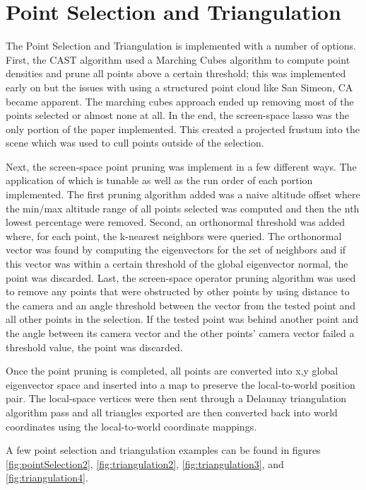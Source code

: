 \section{Point Selection and Triangulation}

The Point Selection and Triangulation is implemented with a number of options. First, the CAST algorithm used a Marching Cubes algorithm to compute point densities and prune all points above a certain threshold; this was implemented early on but the issues with using a structured point cloud like San Simeon, CA became apparent. The marching cubes approach ended up removing most of the points selected or almost none at all. In the end, the screen-space lasso was the only portion of the paper implemented. This created a projected frustum into the scene which was used to cull points outside of the selection. 

Next, the screen-space point pruning was implement in a few different ways. The application of which is tunable as well as the run order of each portion implemented. The first pruning algorithm added was a naive altitude offset where the min/max altitude range of all points selected was computed and then the nth lowest percentage were removed. Second, an orthonormal threshold was added where, for each point, the k-nearest neighbors were queried. The orthonormal vector was found by computing the eigenvectors for the set of neighbors and if this vector was within a certain threshold of the global eigenvector normal, the point was discarded. Last, the screen-space operator pruning algorithm was used to remove any points that were obstructed by other points by using distance to the camera and an angle threshold between the vector from the tested point and all other points in the selection. If the tested point was behind another point and the angle between its camera vector and the other points’ camera vector failed a threshold value, the point was discarded.

Once the point pruning is completed, all points are converted into x,y global eigenvector space and inserted into a map to preserve the local-to-world position pair. The local-space vertices were then sent through a Delaunay triangulation algorithm pass and all triangles exported are then converted back into world coordinates using the local-to-world coordinate mappings.

A few point selection and triangulation examples can be found in figures \ref{fig:pointSelection2}, \ref{fig:triangulation2}, \ref{fig:triangulation3}, and \ref{fig:triangulation4}.

